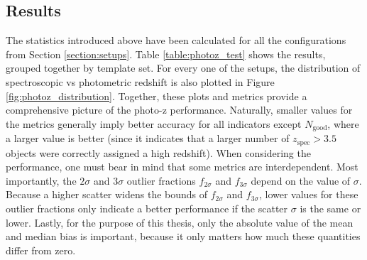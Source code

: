 \subsection{Results}\label{subsection:photoz_results}

The statistics introduced above have been calculated for all the configurations from Section \ref{section:setups}. Table \ref{table:photoz_test} shows the results, grouped together by template set. For every one of the setups, the distribution of spectroscopic vs photometric redshift is also plotted in Figure \ref{fig:photoz_distribution}. Together, these plots and metrics provide a comprehensive picture of the photo-z performance. Naturally, smaller values for the metrics generally imply better accuracy for all indicators except $N_{\mathrm{good}}$, where a larger value is better (since it indicates that a larger number of $z_{\mathrm{spec}}>3.5$ objects were correctly assigned a high redshift). When considering the performance, one must bear in mind that some metrics are interdependent. Most importantly, the $2\sigma$ and $3\sigma$ outlier fractions $f_{2\sigma}$ and $f_{3\sigma}$ depend on the value of $\sigma$. Because a higher scatter widens the bounds of $f_{2\sigma}$ and $f_{3\sigma}$, lower values for these outlier fractions only indicate a better performance if the scatter $\sigma$ is the same or lower. Lastly, for the purpose of this thesis, only the absolute value of the mean and median bias is important,  because it only matters how much these quantities differ from zero.\par


{\vspace{5em plus 2em minus 5em} }



